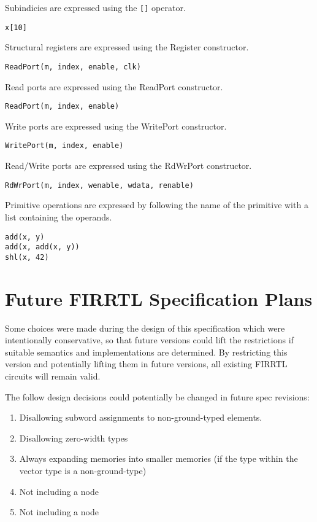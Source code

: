 \documentclass[10pt]{article}
\begin{document}
Subindicies are expressed using the \verb|[]| operator.
\begin{verbatim}
x[10]
\end{verbatim}

Structural registers are expressed using the Register constructor.
\begin{verbatim}
ReadPort(m, index, enable, clk)
\end{verbatim}

Read ports are expressed using the ReadPort constructor.
\begin{verbatim}
ReadPort(m, index, enable)
\end{verbatim}

Write ports are expressed using the WritePort constructor.
\begin{verbatim}
WritePort(m, index, enable)
\end{verbatim}

Read/Write ports are expressed using the RdWrPort constructor.
\begin{verbatim}
RdWrPort(m, index, wenable, wdata, renable)
\end{verbatim}

Primitive operations are expressed by following the name of the primitive with a list containing the operands. 
\begin{verbatim}
add(x, y)
add(x, add(x, y))
shl(x, 42)
\end{verbatim}

\section{Future FIRRTL Specification Plans}
Some choices were made during the design of this specification which were intentionally conservative, so that future versions could lift the restrictions if suitable semantics and implementations are determined. By restricting this version and potentially lifting them in future versions, all existing FIRRTL circuits will remain valid.

The follow design decisions could potentially be changed in future spec revisions:
\begin{enumerate}[topsep=3pt,itemsep=-0.5ex,partopsep=1ex,parsep=1ex]
\item Disallowing subword assignments to non-ground-typed elements.
\item Disallowing zero-width types
\item Always expanding memories into smaller memories (if the type within the vector type is a non-ground-type)
\item Not including a  node
\item Not including a  node
\end{enumerate}
\end{document}
